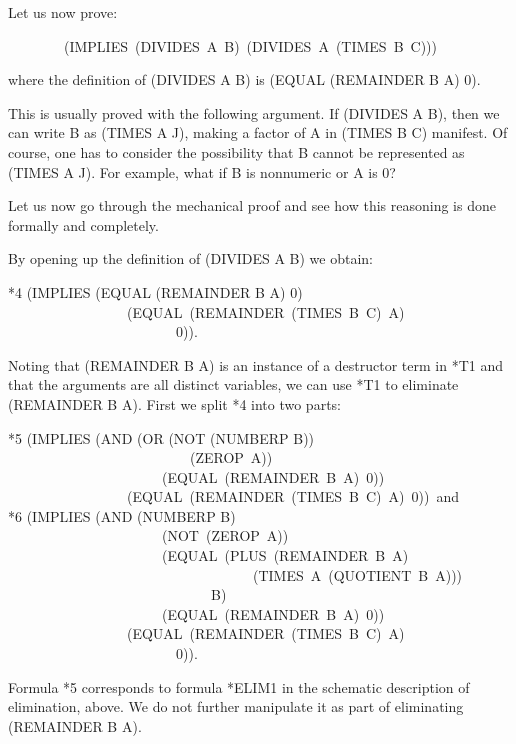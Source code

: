 \documentclass[10pt]{book}
\newenvironment{pubasis}{\begin{flushleft}}{\end{flushleft}}
\begin{document}
Let us now prove:

\begin{pubasis}
~~~~~~~~(IMPLIES~(DIVIDES~A~B)~(DIVIDES~A~(TIMES~B~C)))\\
\end{pubasis}
where the definition of (DIVIDES A B) is (EQUAL (REMAINDER B A) 0).

This is usually proved with the following argument.  If (DIVIDES A B), then we can
write B as (TIMES A J), making a factor of A in (TIMES B C) manifest.
Of course, one has to consider the possibility that B cannot be represented
as (TIMES A J).  For example, what if B is nonnumeric or A is 0?

Let us now go through the mechanical proof and see how this reasoning is
done  formally and completely.

By opening up the definition of (DIVIDES A B) we obtain:

\begin{pubasis}
*4	(IMPLIES (EQUAL (REMAINDER B A) 0)\\
~~~~~~~~~~~~~~~~~(EQUAL~(REMAINDER~(TIMES~B~C)~A)\\
~~~~~~~~~~~~~~~~~~~~~~~~0)).\\
\end{pubasis}
Noting that (REMAINDER B A) is an instance of a destructor term in *T1
and that the arguments are all distinct variables, we can use *T1 to
eliminate (REMAINDER B A).  First we split *4 into two parts:

\begin{pubasis}
*5	(IMPLIES (AND (OR (NOT (NUMBERP B))\\
~~~~~~~~~~~~~~~~~~~~~~~~~~(ZEROP~A))\\
~~~~~~~~~~~~~~~~~~~~~~(EQUAL~(REMAINDER~B~A)~0))\\
~~~~~~~~~~~~~~~~~(EQUAL~(REMAINDER~(TIMES~B~C)~A)~0))~and\\

*6	(IMPLIES (AND (NUMBERP B)\\
~~~~~~~~~~~~~~~~~~~~~~(NOT~(ZEROP~A))\\
~~~~~~~~~~~~~~~~~~~~~~(EQUAL~(PLUS~(REMAINDER~B~A)\\
~~~~~~~~~~~~~~~~~~~~~~~~~~~~~~~~~~~(TIMES~A~(QUOTIENT~B~A)))\\
~~~~~~~~~~~~~~~~~~~~~~~~~~~~~B)\\
~~~~~~~~~~~~~~~~~~~~~~(EQUAL~(REMAINDER~B~A)~0))\\
~~~~~~~~~~~~~~~~~(EQUAL~(REMAINDER~(TIMES~B~C)~A)\\
~~~~~~~~~~~~~~~~~~~~~~~~0)).\\
\end{pubasis}
Formula *5 corresponds to formula *ELIM1 in the schematic description
of elimination, above.  We do not further manipulate it as part
of eliminating (REMAINDER B A).
\end{document}
